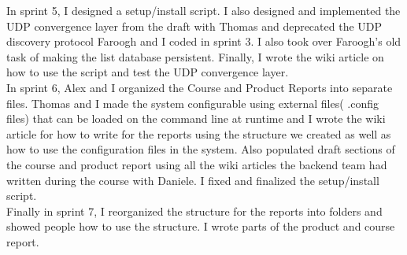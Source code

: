 In sprint 5,
I designed a setup/install script.
I also designed and implemented the UDP convergence layer from the draft with Thomas and deprecated the UDP discovery protocol Faroogh and I coded in sprint 3. 
I also took over Faroogh's old task of making the list database persistent. 
Finally, I wrote the wiki article on how to use the script and test the UDP convergence layer. \\

In sprint 6,
Alex and I organized the Course and Product Reports into separate files.
Thomas and I made the system configurable using external files( .config files) that can be loaded on the command line at runtime and
I wrote the wiki article for how to write for the reports using the structure we created as well as how to use the configuration files in the system.
Also populated draft sections of the course and product report using all the wiki articles the backend team had written during the course with Daniele.
I fixed and finalized the setup/install script.\\

Finally in sprint 7,
I reorganized the structure for the reports into folders and showed people how to use the structure.
I wrote parts of the product and course report.\\
